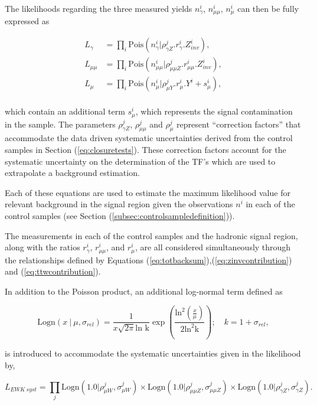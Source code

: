 The likelihoods regarding the three measured yields $n^{i}_{\gamma}$, $n^{i}_{\mu\mu}$, $n^{i}_{\mu}$ can then be fully expressed as

\begin{align}
L_{\gamma} &= \prod_{i} \text{Pois} (n^{i}_{\gamma} | \rho^{j}_{\gamma Z} . r^{i}_{\gamma} . Z^{i}_{inv}), \\
L_{\mu\mu} &= \prod_{i} \text{Pois} (n^{i}_{\mu\mu} | \rho^{j}_{\mu\mu Z} . r^{i}_{\mu\mu} . Z^{i}_{inv}), \\
L_{\mu} &= \prod_{i} \text{Pois} (n^{i}_{\mu} | \rho^{j}_{\mu Y} . r^{i}_{\mu} . Y^{i} + s^{i}_{\mu}), \\
\end{align}

which contain an additional term $s^{i}_{\mu}$, which represents the signal contamination in the \mupjets sample. The parameters $\rho^{j}_{\gamma Z}$, $\rho^{j}_{\mu\mu}$ and $\rho^{j}_{\mu}$ represent ``correction factors'' that accommodate the data driven systematic uncertainties derived from the control samples in Section (\ref{eq:closuretests}). These correction factors account for the systematic uncertainty on the determination of the \ac{TF}'s which are used to extrapolate a background estimation.

Each of these equations are used to estimate the maximum likelihood value for relevant background in the signal region given the observations $n^{i}$ in each of the control samples (see Section (\ref{subsec:controlsampledefinition})).

The measurements in each of the control samples and the hadronic signal region, along with the ratios $r^{i}_{\gamma}$, $r^{i}_{\mu\mu}$, and $r^{i}_{\mu}$, are all considered simultaneously through the relationships defined by Equations (\ref{eq:totbacksum}),(\ref{eq:zinvcontribution}) and (\ref{eq:ttwcontribution}).

In addition to the Poisson product, an additional log-normal term \cite{logndistribution} defined as

\begin{equation}
\text{Logn}(x\ |\ \xspace \mu, \sigma_{rel}) = \frac{1}{x\sqrt{2\pi}\text{ln k}}\exp\left(\frac{\text{ln}^{2}(\frac{x}{\mu})}{2\text{ln}^{2}\text{k}}\right); \quad k = 1 + \sigma_{rel},
\end{equation}

is introduced to accommodate the systematic uncertainties given in the likelihood by,

\begin{equation}
L_{EWK\ syst} = \prod_{j} \text{Logn}(1.0|\rho^{j}_{\mu W},\sigma^{j}_{\mu W} ) \times \text{Logn}(1.0|\rho^{j}_{\mu\mu Z},\sigma^{j}_{\mu\mu Z} ) \times \text{Logn}(1.0|\rho^{j}_{\gamma Z},\sigma^{j}_{\gamma Z} ).
\end{equation}

